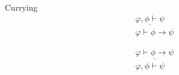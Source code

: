 \begin{ruleinf} \label{relinf_cases} Currying
	\begin{equation}
	\begin{gathered}
		\underline {\varphi, \phi  \vdash \psi } \\
		\varphi \vdash \phi \to \psi 
	\end{gathered}
	\end{equation}

	\begin{equation}
		\begin{gathered}
			\underline {\varphi \vdash \phi \to \psi } \\
			\varphi, \phi  \vdash \psi 
		\end{gathered}
	\end{equation}
\end{ruleinf}
